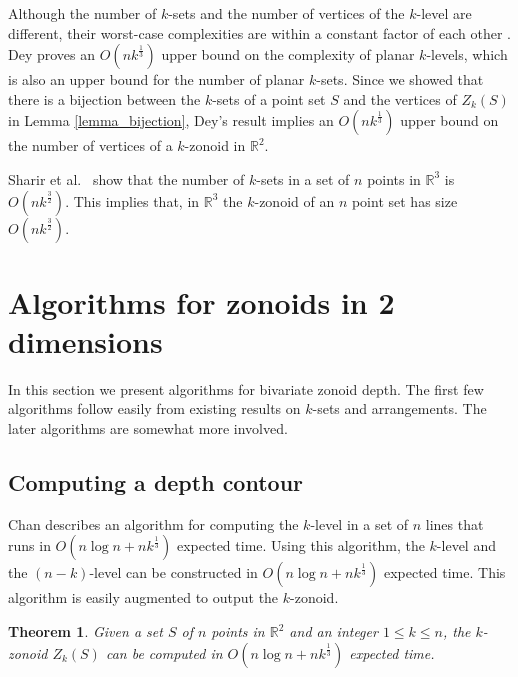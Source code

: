 \documentclass{elsart}
\newtheorem{theorem}{Theorem}
\begin{document}
Although the number of $k$-sets and the number of vertices of the
$k$-level are different, their worst-case complexities are within a
constant factor of each other \cite{edelsbrunner_book}. Dey
\cite{improved_bounds_on_planar_ksets_and_klevels} proves an
$O(nk^{\frac{1}{3}})$ upper bound on the complexity of planar
$k$-levels, which is also an upper bound for the number of planar
$k$-sets. Since we showed that there is a bijection between the
$k$-sets of a point set $S$ and the vertices of $Z_k(S)$ in Lemma
\ref{lemma_bijection}, Dey's result implies an $O(nk^{\frac{1}{3}})$
upper bound on the number of vertices of a $k$-zonoid in
$\mathbb{R}^2$.

Sharir et al.\ \cite{an_improved_bound_for_ksets_in_three_dimensions}
show that the number of $k$-sets in a set of $n$ points in
$\mathbb{R}^3$ is $O(nk^{\frac{3}{2}})$. This implies that, in
$\mathbb{R}^3$ the $k$-zonoid of an $n$ point set has size
$O(nk^{\frac{3}{2}})$.

\section{Algorithms for zonoids in 2 dimensions}
\label{section_algorithms_for_zonoids_in_2_dimensions}

In this section we present algorithms for bivariate zonoid depth. The
first few algorithms follow easily from existing results on $k$-sets
and arrangements. The later algorithms are somewhat more involved.

\subsection{Computing a depth contour}
\label{subsection_computing_a_depth_countour}

Chan \cite{remarks_on_klevel_algorithms_in_the_plane} describes an
algorithm for computing the $k$-level in a set of $n$ lines that runs
in $O(n \log n + nk^{\frac{1}{3}})$ expected time. Using this
algorithm, the $k$-level and the $(n-k)$-level can be constructed in
$O(n \log n + nk^{\frac{1}{3}})$ expected time. This algorithm is
easily augmented to output the $k$-zonoid. 

\begin{theorem}\label{theorem_build_k_zonoid}
Given a set $S$ of $n$ points in $\mathbb{R}^2$ and an integer $1 \le
k \le n$, the $k$-zonoid $Z_k(S)$ can be computed in $O(n \log n +
nk^{\frac{1}{3}})$ expected time.
\end{theorem}
\end{document}
